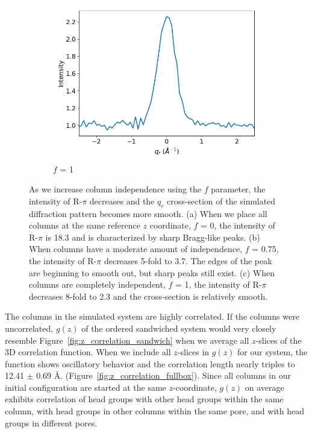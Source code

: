 \documentclass[journal=jpcbfk,manuscript=article]{achemso}
\begin{document}
\begin{figure}
\begin{subfigure}{0.3\textwidth}
  \includegraphics[width=\textwidth]{sf_qy_sr100.png}
  \caption{$f$ = 1}\label{fig:sf_qy_sr100}
  \end{subfigure}
  \caption{As we increase column independence using the $f$ parameter, the
	  intensity of R-$\pi$ decreases and the $q_r$ cross-section of the simulated
	  diffraction pattern becomes more smooth.  (a) When we place all columns at the
	  same reference $z$ coordinate, $f$ = 0, the intensity of R-$\pi$ is 18.3 and is
	  characterized by sharp Bragg-like peaks. (b) When columns have a moderate
	  amount of independence, $f$ = 0.75, the intensity of R-$\pi$ decreases 5-fold
	  to 3.7. The edges of the peak are beginning to smooth out, but sharp peaks
	  still exist. (c) When columns are completely independent, $f$ = 1, the
	  intensity of R-$\pi$ decreases 8-fold to 2.3 and the cross-section is
          relatively smooth.}\label{fig:column_displacement}
  \end{figure}
  
  The columns in the simulated system are highly correlated. If the columns were
  uncorrelated, $g(z)$ of the ordered sandwiched system would very closely resemble 
  Figure~\ref{fig:z_correlation_sandwich} when we average all $z$-slices of the
  3D correlation function. When we include all $z$-slices in $g(z)$ for our system,
  the function shows oscillatory behavior and the correlation length nearly triples
  to 12.41 $\pm$ 0.69 \AA. (Figure~\ref{fig:z_correlation_fullbox}). Since all 
  columns in our initial configuration are started at the same $z$-coordinate, 
  $g(z)$ on average exhibits correlation of head groups with other head groups
  within the same column, with head groups in other columns within the same pore, 
  and with head groups in different pores.
  
\end{document}
